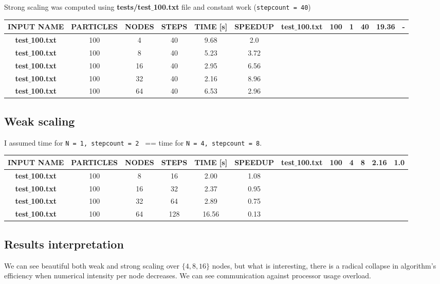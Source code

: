 \documentclass[12pt]{article}
\newcommand{\code}[1]{\texttt{#1}}
\begin{document}
Strong scaling was computed using \textbf{tests/test$\_$100.txt} file and constant work (\code{stepcount = 40})
\begin{center}
\begin{tabular}{ |c c c c c c| }
 \hline
 \textbf{INPUT NAME} & \textbf{PARTICLES} & \textbf{NODES} & \textbf{STEPS} & \textbf{TIME [s]} & \textbf{SPEEDUP} &
 \hline
 \textbf{test$\_$100.txt} & 100 & 1 & 40 & 19.36 & - \\
 \hline
 \textbf{test$\_$100.txt} & 100 & 4 & 40 & 9.68 & 2.0 \\
 \hline
 \textbf{test$\_$100.txt} & 100 & 8 & 40 & 5.23 & 3.72 \\
 \hline
 \textbf{test$\_$100.txt} & 100 & 16 & 40 & 2.95 & 6.56 \\
 \hline
 \textbf{test$\_$100.txt} & 100 & 32 & 40 & 2.16 & 8.96 \\
 \hline
 \textbf{test$\_$100.txt} & 100 & 64 & 40 & 6.53 & 2.96 \\
 \hline
\end{tabular}
\end{center}



\subsection*{Weak scaling}

I assumed time for \code{N = 1, stepcount = 2 } == time for \code{N = 4, stepcount = 8}.

\begin{center}
\begin{tabular}{ |c c c c c c| }
 \hline
 \textbf{INPUT NAME} & \textbf{PARTICLES} & \textbf{NODES} & \textbf{STEPS} & \textbf{TIME [s]} & \textbf{SPEEDUP} &
 \hline
 \textbf{test$\_$100.txt} & 100 & 4 & 8 & 2.16 & 1.0 \\
 \hline
 \textbf{test$\_$100.txt} & 100 & 8 & 16 & 2.00 & 1.08 \\
 \hline
 \textbf{test$\_$100.txt} & 100 & 16 & 32 & 2.37 & 0.95 \\
 \hline
 \textbf{test$\_$100.txt} & 100 & 32 & 64 & 2.89 & 0.75 \\
 \hline
 \textbf{test$\_$100.txt} & 100 & 64 & 128 & 16.56 & 0.13 \\
 \hline
\end{tabular}
\end{center}


\subsection*{Results interpretation}

We can see beautiful both weak and strong scaling over $\{ 4, 8, 16\}$ nodes, but what is interesting, there is a radical collapse in algorithm's efficiency when numerical intensity per node decreases. We can see communication against processor usage overload.
\end{document}
